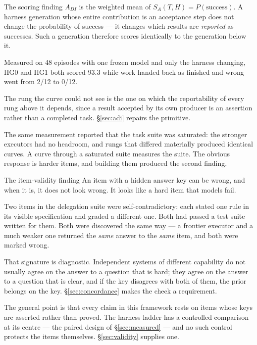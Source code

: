 \documentclass[11pt]{article}
\theoremstyle{definition}
\newcommand{\SA}{\ensuremath{S_A(T,H)}}
\begin{document}
\begin{cautionbox}{The scoring finding}
$A_{DI}$ is the weighted mean of $\SA{} = P(\text{success})$. A harness generation whose entire contribution is an acceptance step does not change the probability of success --- it changes which results are \emph{reported} as successes. Such a generation therefore scores identically to the generation below it.

Measured on 48 episodes with one frozen model and only the harness changing, HG0 and HG1 both scored 93.3 while work handed back as finished and wrong went from 2/12 to 0/12.

The rung the curve could not see is the one on which the reportability of every rung above it depends, since a result accepted by its own producer is an assertion rather than a completed task. \S\ref{sec:adi} repairs the primitive.
\end{cautionbox}

The same measurement reported that the task suite was saturated: the stronger executors had no headroom, and rungs that differed materially produced identical curves. A curve through a saturated suite measures the suite. The obvious response is harder items, and building them produced the second finding.

\begin{cautionbox}{The item-validity finding}
An item with a hidden answer key can be wrong, and when it is, it does not look wrong. It looks like a hard item that models fail.

Two items in the delegation suite were self-contradictory: each stated one rule in its visible specification and graded a different one. Both had passed a test suite written for them. Both were discovered the same way --- a frontier executor and a much weaker one returned the \emph{same} answer to the \emph{same} item, and both were marked wrong.

That signature is diagnostic. Independent systems of different capability do not usually agree on the answer to a question that is hard; they agree on the answer to a question that is clear, and if the key disagrees with both of them, the prior belongs on the key. \S\ref{sec:concordance} makes the check a requirement.
\end{cautionbox}

The general point is that every claim in this framework rests on items whose keys are asserted rather than proved. The harness ladder has a controlled comparison at its centre --- the paired design of \S\ref{sec:measured} --- and no such control protects the items themselves. \S\ref{sec:validity} supplies one.
\end{document}
